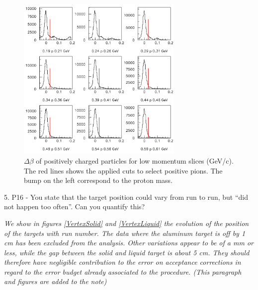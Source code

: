 \documentclass[12pt]{article}
\begin{document}
\begin{figure}[tbp]
\centering
\includegraphics[width=8cm] {answer-fig/TofProfile1.png} 
\caption {$\Delta \beta$ of positively charged particles for low momentum slices 
(GeV/c). The red lines shows the applied cuts to select positive pions. The bump on the left
correspond to the proton mass.}
\label{TOF-3}
\end{figure}

5.
P16 - You state that the target position could vary from run to run, but “did not happen too 
often”.  Can you quantify this?  

{\it We show in figures \ref{VertexSolid} and \ref{VertexLiquid} the evolution 
of the position of the targets with run number. The data where the aluminum
target is off by 1 cm has been excluded from the analysis. Other variations
appear to be of a mm or less, while the gap between the solid and liquid target
is about 5 cm. They should therefore have negligible contribution to the 
error on acceptance corrections in regard to the error budget already associated
to the procedure. (This paragraph and figures are added to the note)}\\
\end{document}
